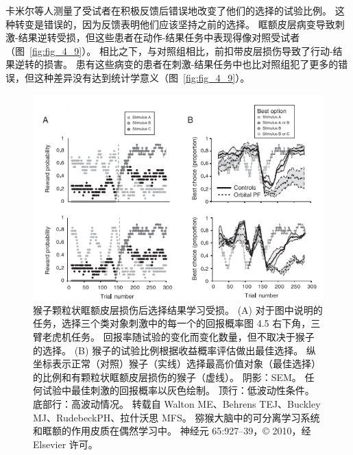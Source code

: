卡米尔等人测量了受试者在积极反馈后错误地改变了他们的选择的试验比例。
这种转变是错误的，因为反馈表明他们应该坚持之前的选择。
眶额皮层病变导致刺激-结果逆转受损，但这些患者在动作-结果任务中表现得像对照受试者（图~\ref{fig:fig_4_9}）。
相比之下，与对照组相比，前扣带皮层损伤导致了行动-结果逆转的损害。
患有这些病变的患者在刺激-结果任务中也比对照组犯了更多的错误，但这种差异没有达到统计学意义（图~\ref{fig:fig_4_9}）。\par


\begin{figure}[!htb]
	\centering
	\includegraphics{image_pfc/Fig_4_6}
	\caption{猴子颗粒状眶额皮层损伤后选择结果学习受损。
		(A) 对于图中说明的任务，选择三个类对象刺激中的每一个的回报概率图 4.5 右下角，三臂老虎机任务。
		回报率随试验的变化而变化数量，但不取决于猴子的选择。
		(B) 猴子的试验比例根据收益概率评估做出最佳选择。 纵坐标表示正常（对照）猴子（实线）选择最高价值对象（最佳选择）的比例和有颗粒状眶额皮层损伤的猴子（虚线）。
		阴影：SEM。
		任何试验中最佳刺激的回报概率以灰色绘制。
		顶行：低波动性条件。
		底部行：高波动情况。
		转载自 Walton ME、Behrens TEJ、Buckley MJ、RudebeckPH、拉什沃思 MFS。
		猕猴大脑中的可分离学习系统和眶额的作用皮质在偶然学习中。
		神经元 65:927–39，© 2010，经 Elsevier 许可。}
	\label{fig:fig_4_6}
\end{figure}


